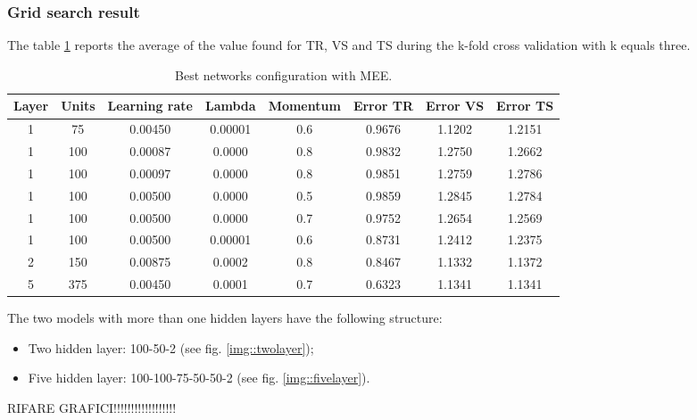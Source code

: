 \subsubsection{Grid search result}
The table \ref{tab:best_nets} reports the average of the value found for TR, VS and TS during the k-fold cross validation with k equals three.   
\begin{center}
\small\addtolength{\tabcolsep}{-3pt}
\begin{table}[h!]
	\centering
	\begin{tabular}{|c|c|c|c|c|c|c|c|}
		\hline
		\textbf{Layer}& \textbf{Units}& \textbf{Learning rate} & \multicolumn{1}{l|}{\textbf{Lambda}} & \textbf{Momentum} & \textbf{Error TR}& \textbf{Error VS}& \textbf{Error TS}\\ \hline
			1 & 75 & 0.00450 & 0.00001 & 0.6  & 0.9676 & 1.1202 & 1.2151  \\
			1 & 100 & 0.00087 & 0.0000 & 0.8  & 0.9832 & 1.2750 &  1.2662\\
			1 & 100 & 0.00097 & 0.0000 & 0.8  & 0.9851 & 1.2759 &  1.2786\\
			1 & 100 & 0.00500 & 0.0000 & 0.5  & 0.9859 & 1.2845 & 1.2784 \\
			1 & 100 & 0.00500 & 0.0000 & 0.7  & 0.9752 & 1.2654 & 1.2569 \\
			1 & 100 & 0.00500 & 0.00001 & 0.6  & 0.8731& 1.2412 & 1.2375 \\
			2 & 150 & 0.00875 & 0.0002 & 0.8  & 0.8467 & 1.1332 &  1.1372 \\
			5 & 375 & 0.00450 & 0.0001 & 0.7  & 0.6323 & 1.1341 &  1.1341 \\
		  \hline
	\end{tabular}
		\caption{Best networks configuration with MEE.}
		\label{tab:best_nets}
\end{table}
\end{center}
The two models with more than one hidden layers have the following structure:
\begin{itemize}
	\item Two hidden layer: 100-50-2 (see fig. \ref{img::twolayer});
	\item Five hidden layer: 100-100-75-50-50-2 (see fig. \ref{img::fivelayer}).
\end{itemize}
RIFARE GRAFICI!!!!!!!!!!!!!!!!!!
\vspace{0.5cm}

